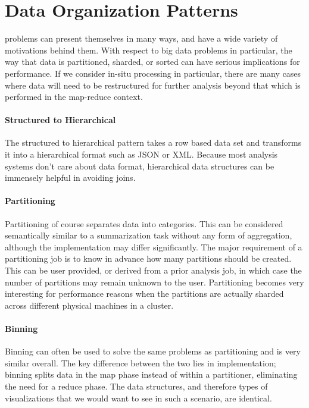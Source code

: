 \section{Data Organization Patterns}
\label{sec:dataorganization}
 problems can present themselves in many ways, and have a wide variety of motivations behind them. With respect to big data problems in particular, the way that data is partitioned, sharded, or sorted can have serious implications for performance. If we consider in-situ processing in particular, there are many cases where data will need to be restructured for further analysis beyond that which is performed in the map-reduce context.

\paragraph{Structured to Hierarchical}
The structured to hierarchical pattern takes a row based data set and transforms it into a hierarchical format such as JSON or XML. Because most analysis systems don't care about data format, hierarchical data structures can be immensely helpful in avoiding joins.

\paragraph{Partitioning}
Partitioning of course separates data into categories. This can be considered semantically similar to a summarization task without any form of aggregation, although the implementation may differ significantly. The major requirement of a partitioning job is to know in advance how many partitions should be created. This can be user provided, or derived from a prior analysis job, in which case the number of partitions may remain unknown to the user. Partitioning becomes very interesting for performance reasons when the partitions are actually sharded across different physical machines in a cluster.

\paragraph{Binning}
Binning can often be used to solve the same problems as partitioning and is very similar overall. The key difference between the two lies in implementation; binning splits data in the map phase instead of within a partitioner, eliminating the need for a reduce phase. The data structures, and therefore types of visualizations that we would want to see in such a scenario, are identical.

